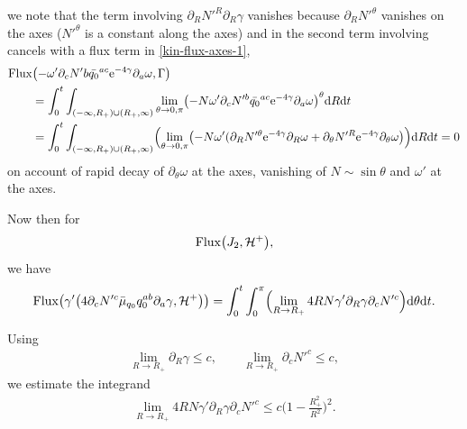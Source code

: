\documentclass[11pt]{article}
\numberwithin{equation}{section}
\def\ptl{\partial}%
\numberwithin{equation}{section}
\begin{document}
we note that the term involving $ \ptl_R N'^R \ptl_R \gamma $ vanishes because $\ptl_R N'^\theta$ vanishes on the axes \big($N'^\theta $ is a constant along the axes\big)
and in the second term involving \smash{$\ptl_\theta N'^\theta \ptl_\theta \gamma$} cancels with a flux term in \eqref{kin-flux-axes-1},
\begin{align*}
& {\rm Flux} \bigl(-\omega' \ptl_c N'b \bar{q_0}^{ac} {\rm e}^{-4\gamma} \ptl_a \omega, \Gamma\bigr) \notag\\
&\qquad{}= \int^t_0 \int_{ (-\infty, R_+) \cup (R_+, \infty) } \lim_{\theta \to 0, \pi} \bigl(
-N \omega' \ptl_c N'^b \bar{q_0}^{ac} {\rm e}^{-4\gamma} \ptl_a \omega \bigr)^\theta {\rm d}R {\rm d}t \notag\\
&\qquad{}= \int^t_0 \int_{ (-\infty, R_+) \cup (R_+, \infty) } \Bigl(\lim_{\theta \to 0, \pi} \bigl(- N \omega' (\ptl_R N'^ \theta {\rm e}^{-4\gamma} \ptl_R \omega + \ptl_\theta N'^ R {\rm e}^{-4 \gamma} \ptl_\theta \omega\bigr) \Bigr) {\rm d}R {\rm d}t
=0
\end{align*}
on account of rapid decay of $\ptl_\theta \omega$ at the axes, vanishing of $N \sim \sin \theta $ and $\omega'$ at the axes.

Now then for
\begin{align*}
{\rm Flux} \bigl(J_2, \mathcal{H}^+\bigr),
\end{align*}
we have
\begin{align*}
{\rm Flux} \bigl(\gamma' \bigl(4 \ptl_c N'^c \bar{\mu}_{q_0} q^{ab} _0 \ptl_a \gamma, \mathcal{H}^+\bigr)\bigr)
= \int^t_0 \int^\pi_0 \Bigl(\lim_{R \to R_+} 4 R N \gamma' \ptl_R \gamma \ptl_c N'^c\Bigr) {\rm d} \theta {\rm d}t.
\end{align*}

Using
\begin{align*}
\lim_{R \to R_+} \ptl_R \gamma \leq c, \qquad \lim_{R \to R_+} \ptl_c N'^c \leq c,
\end{align*}
 we estimate the integrand
\begin{align*}
\lim_{R \to R_+} 4 R N \gamma' \ptl_R \gamma \ptl_c N'^c \leq c \biggl(1- \frac{R^2_+}{R^2}\biggr)^2.
\end{align*}
\end{document}
